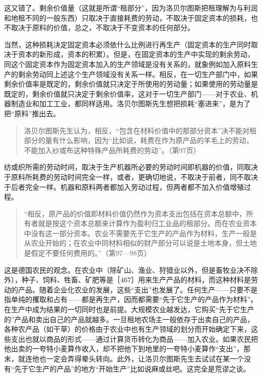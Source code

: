 这又错了。剩余价值量（这就是所谓“租部分”，因为洛贝尔图斯把租理解为与利润和地租不同的一般东西）只取决于直接耗费的劳动，不取决于固定资本的损耗，也不取决于原料的价值，总之，不取决于不变资本的任何部分。

当然，这种损耗决定固定资本必须依什么比例进行再生产（固定资本的生产同时取决于资本的新形成，资本的积累）。但是，在固定资本的生产中实现的剩余劳动，同这个固定资本作为固定资本加入的生产领域是没有关系的，就象例如加入原料生产的剩余劳动同上述这个生产领域没有关系一样。相反，在一切生产部门中，如果剩余价值率是既定的，剩余价值就只决定于所使用的劳动量；如果使用的劳动量是既定的，剩余价值就只决定于剩余价值率，这对于一切生产部门——对于农业、机器制造业和加工工业，都同样适用。洛贝尔图斯先生想把损耗“塞进来”，是为了把“原料”推出去。

\begin{quote}{洛贝尔图斯先生认为，相反，“包含在材料价值中的那部分资本”决不能对租部分的量有什么影响，因为“比如说，耗费在作为原产品的羊毛上的劳动，不能加入纱或布这种特殊产品所耗费的劳动”。（第97页）}\end{quote}

纺或织所需的劳动时间，取决于生产机器所必要的劳动时间即机器的价值，同取决于原料所耗费的劳动时间完全一样，或者，更确切地说，不取决于前者，同不取决于后者完全一样。机器和原料两者都加入劳动过程，但两者都不加入价值增殖过程。

\begin{quote}{“相反，原产品的价值即材料价值仍然作为资本支出包括在资本总额中，所有者就是按这个资本总额来计算作为盈利归工业品的租部分。而在农业资本中没有这一部分资本。农业不需要先于它生产的产品作为材料，生产一般是从农业开始的；在农业中同材料相似的财产部分可以说是土地本身，但土地是假定不要任何费用的。”（第97—98页）}\end{quote}

这是德国农民的观念。在农业中（除矿山、渔业、狩猎业以外，但是畜牧业决不除外），种子、饲料、牲畜、矿肥等是［467］用来生产产品的材料，而这种材料是劳动的产品。随着企业化农业的发展，这些“支出”也发展了。任何生产——只要不是指单纯的攫取和占有——都是再生产，因而都需要“先于它生产的产品作为材料”。在生产中成为结果的一切同时也是前提。大规模农业越发达，它购买“先于它生产的”产品和卖出自己的产品就越多。一旦租地农场主一般依存于出卖自己的产品，各种农产品（如干草）的价格由于农业中也有生产领域的划分而开始确定下来，这些支出也就以商品的形式——通过计算货币转化为商品——加入农业。如果农民把他出卖的一夸特小麦算作收入，却不把他下到地里的一夸特小麦算作“支出”，那末，就连他也一定会弄得晕头转向。此外，让洛贝尔图斯先生去试试在某一个没有“先于它生产的产品”的地方“开始生产”比如说麻或丝吧。这完全是荒谬之谈。

